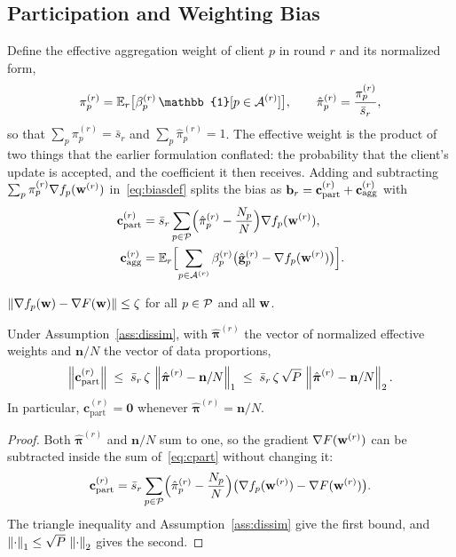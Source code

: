 \begin{revblock}
\subsection{Participation and Weighting Bias}
\label{subsec:bias}
Define the effective aggregation weight of client $p$ in round $r$ and its normalized form,
\begin{equation}
	\pi_p^{(r)}=\E_r\bigl[\beta_p^{(r)}\,\mathbb{1}[p\in\cA^{(r)}]\bigr],\qquad \hat\pi_p^{(r)}=\frac{\pi_p^{(r)}}{\bar s_r},
	\label{eq:effweight}
\end{equation}
so that $\sum_p\pi_p^{(r)}=\bar s_r$ and $\sum_p\hat\pi_p^{(r)}=1$. The effective weight is the product of two things that the earlier formulation conflated: the probability that the client's update is accepted, and the coefficient it then receives. Adding and subtracting $\sum_p\pi_p^{(r)}\nabla f_p(\mathbf{w}^{(r)})$ in~\eqref{eq:biasdef} splits the bias as $\mathbf{b}_r=\mathbf{c}_{\mathrm{part}}^{(r)}+\mathbf{c}_{\mathrm{agg}}^{(r)}$ with
\begin{align}
	\mathbf{c}_{\mathrm{part}}^{(r)}&=\bar s_r\sum_{p\in\mathcal{P}}\Bigl(\hat\pi_p^{(r)}-\frac{N_p}{N}\Bigr)\nabla f_p(\mathbf{w}^{(r)}), \label{eq:cpart}\\
	\mathbf{c}_{\mathrm{agg}}^{(r)}&=\mathbb{E}_r\Bigl[\sum_{p\in\mathcal{A}^{(r)}}\beta_p^{(r)}\bigl(\hat{\mathbf{g}}_p^{(r)}-\nabla f_p(\mathbf{w}^{(r)})\bigr)\Bigr]. \label{eq:cagg}
\end{align}

\begin{assumption}
	\label{ass:dissim}
	$\left\lVert \nabla f_p(\mathbf{w})-\nabla F(\mathbf{w}) \right\rVert\le\zeta$ for all $p\in\mathcal{P}$ and all $\mathbf{w}$.
\end{assumption}

\begin{proposition}
	\label{prop:bias}
	Under Assumption~\ref{ass:dissim}, with $\hat{\boldsymbol{\pi}}^{(r)}$ the vector of normalized effective weights and $\mathbf{n}/N$ the vector of data proportions,
	\begin{equation}
		\left\lVert \mathbf{c}_{\mathrm{part}}^{(r)} \right\rVert\;\le\;\bar s_r\,\zeta\,\left\lVert \hat{\boldsymbol{\pi}}^{(r)}-\mathbf{n}/N \right\rVert_1\;\le\;\bar s_r\,\zeta\,\sqrt{P}\,\left\lVert \hat{\boldsymbol{\pi}}^{(r)}-\mathbf{n}/N \right\rVert_2 .
		\label{eq:biasbound}
	\end{equation}
	In particular, $\mathbf{c}_{\mathrm{part}}^{(r)}=\mathbf{0}$ whenever $\hat{\boldsymbol{\pi}}^{(r)}=\mathbf{n}/N$.
\end{proposition}
\begin{proof}
	Both $\hat{\boldsymbol{\pi}}^{(r)}$ and $\mathbf{n}/N$ sum to one, so the gradient $\nabla F(\mathbf{w}^{(r)})$ can be subtracted inside the sum of~\eqref{eq:cpart} without changing it:
	\begin{equation*}
		\mathbf{c}_{\mathrm{part}}^{(r)}=\bar s_r\sum_{p\in\mathcal{P}}\Bigl(\hat\pi_p^{(r)}-\frac{N_p}{N}\Bigr)\bigl(\nabla f_p(\mathbf{w}^{(r)})-\nabla F(\mathbf{w}^{(r)})\bigr).
	\end{equation*}
	The triangle inequality and Assumption~\ref{ass:dissim} give the first bound, and $\left\lVert \cdot \right\rVert_1\le\sqrt{P}\,\left\lVert \cdot \right\rVert_2$ gives the second.
\end{proof}


\end{revblock}
